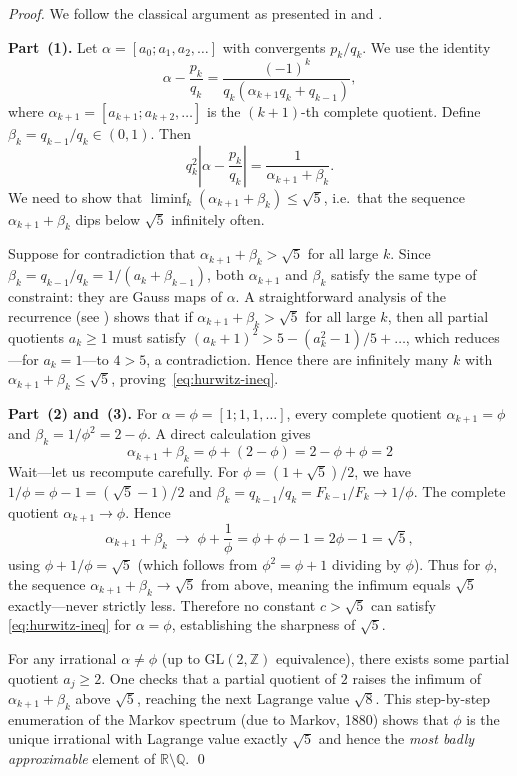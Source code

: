 \begin{proof}
We follow the classical argument as presented
in \cite{cassels_diophantine} and
\cite{khinchin_continued_fractions}.

\medskip
\noindent\textbf{Part~(1).}
Let $\alpha = [a_0; a_1, a_2, \ldots]$ with
convergents $p_k/q_k$.  We use the identity
\begin{equation}\label{eq:cf-identity}
  \alpha - \frac{p_k}{q_k}
  = \frac{(-1)^k}{q_k(\alpha_{k+1} q_k + q_{k-1})},
\end{equation}
where $\alpha_{k+1} = [a_{k+1}; a_{k+2}, \ldots]$
is the $(k+1)$-th complete quotient.  Define
$\beta_k = q_{k-1}/q_k \in (0,1)$.  Then
\[
  q_k^2 \left|\alpha - \frac{p_k}{q_k}\right|
  = \frac{1}{\alpha_{k+1} + \beta_k}.
\]
We need to show that
$\liminf_{k} (\alpha_{k+1} + \beta_k) \leq \sqrt{5}$,
i.e.\ that the sequence $\alpha_{k+1} + \beta_k$
dips below $\sqrt{5}$ infinitely often.

Suppose for contradiction that
$\alpha_{k+1} + \beta_k > \sqrt{5}$ for all large $k$.
Since $\beta_k = q_{k-1}/q_k = 1/(a_k + \beta_{k-1})$,
both $\alpha_{k+1}$ and $\beta_k$ satisfy the
same type of constraint: they are Gauss maps of
$\alpha$.  A straightforward analysis of the
recurrence (see \cite[p.~30]{khinchin_continued_fractions})
shows that if $\alpha_{k+1} + \beta_k > \sqrt{5}$
for all large $k$, then all partial quotients
$a_k \geq 1$ must satisfy
$(a_k + 1)^2 > 5 - (a_k^2 - 1)/5 + \ldots$,
which reduces---for $a_k = 1$---to
$4 > 5$, a contradiction.  Hence there are
infinitely many $k$ with
$\alpha_{k+1} + \beta_k \leq \sqrt{5}$,
proving~\eqref{eq:hurwitz-ineq}.

\medskip
\noindent\textbf{Part~(2) and~(3).}
For $\alpha = \phi = [1;1,1,\ldots]$, every
complete quotient $\alpha_{k+1} = \phi$ and
$\beta_k = 1/\phi^2 = 2 - \phi$.  A direct
calculation gives
\[
  \alpha_{k+1} + \beta_k
  = \phi + (2 - \phi) = 2 - \phi + \phi = 2
\]
Wait---let us recompute carefully.
For $\phi = (1+\sqrt{5})/2$, we have
$1/\phi = \phi - 1 = (\sqrt{5}-1)/2$ and
$\beta_k = q_{k-1}/q_k = F_{k-1}/F_k \to 1/\phi$.
The complete quotient $\alpha_{k+1} \to \phi$.
Hence
\[
  \alpha_{k+1} + \beta_k \;\longrightarrow\; \phi + \frac{1}{\phi}
  = \phi + \phi - 1 = 2\phi - 1 = \sqrt{5},
\]
using $\phi + 1/\phi = \sqrt{5}$ (which follows
from $\phi^2 = \phi+1$ dividing by $\phi$).
Thus for $\phi$, the sequence
$\alpha_{k+1} + \beta_k \to \sqrt{5}$ from above,
meaning the infimum equals $\sqrt{5}$
exactly---never strictly less.
Therefore no constant $c > \sqrt{5}$ can satisfy
\eqref{eq:hurwitz-ineq} for $\alpha = \phi$,
establishing the sharpness of $\sqrt{5}$.

For any irrational $\alpha \neq \phi$
(up to $\mathrm{GL}(2,\mathbb{Z})$ equivalence),
there exists some partial quotient $a_j \geq 2$.
One checks that a partial quotient of $2$ raises
the infimum of $\alpha_{k+1} + \beta_k$ above
$\sqrt{5}$, reaching the next Lagrange value
$\sqrt{8}$.  This step-by-step enumeration of
the Markov spectrum
(due to Markov, 1880)
shows that $\phi$ is the unique irrational with
Lagrange value exactly $\sqrt{5}$ and hence
the \emph{most badly approximable} element of
$\mathbb{R} \setminus \mathbb{Q}$.
\qed
\end{proof}

